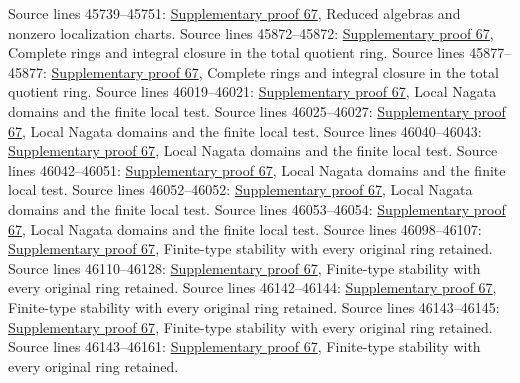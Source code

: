 \begin{AlgebraSourceRoutes}
 Source lines 45739--45751: \hyperlink{algebra_nagata_notes_20260929}{Supplementary proof 67}, Reduced algebras and nonzero localization charts.
 Source lines 45872--45872: \hyperlink{algebra_nagata_notes_20260929}{Supplementary proof 67}, Complete rings and integral closure in the total quotient ring.
 Source lines 45877--45877: \hyperlink{algebra_nagata_notes_20260929}{Supplementary proof 67}, Complete rings and integral closure in the total quotient ring.
 Source lines 46019--46021: \hyperlink{algebra_nagata_notes_20260929}{Supplementary proof 67}, Local Nagata domains and the finite local test.
 Source lines 46025--46027: \hyperlink{algebra_nagata_notes_20260929}{Supplementary proof 67}, Local Nagata domains and the finite local test.
 Source lines 46040--46043: \hyperlink{algebra_nagata_notes_20260929}{Supplementary proof 67}, Local Nagata domains and the finite local test.
 Source lines 46042--46051: \hyperlink{algebra_nagata_notes_20260929}{Supplementary proof 67}, Local Nagata domains and the finite local test.
 Source lines 46052--46052: \hyperlink{algebra_nagata_notes_20260929}{Supplementary proof 67}, Local Nagata domains and the finite local test.
 Source lines 46053--46054: \hyperlink{algebra_nagata_notes_20260929}{Supplementary proof 67}, Local Nagata domains and the finite local test.
 Source lines 46098--46107: \hyperlink{algebra_nagata_notes_20260929}{Supplementary proof 67}, Finite-type stability with every original ring retained.
 Source lines 46110--46128: \hyperlink{algebra_nagata_notes_20260929}{Supplementary proof 67}, Finite-type stability with every original ring retained.
 Source lines 46142--46144: \hyperlink{algebra_nagata_notes_20260929}{Supplementary proof 67}, Finite-type stability with every original ring retained.
 Source lines 46143--46145: \hyperlink{algebra_nagata_notes_20260929}{Supplementary proof 67}, Finite-type stability with every original ring retained.
 Source lines 46143--46161: \hyperlink{algebra_nagata_notes_20260929}{Supplementary proof 67}, Finite-type stability with every original ring retained.

\end{AlgebraSourceRoutes}
